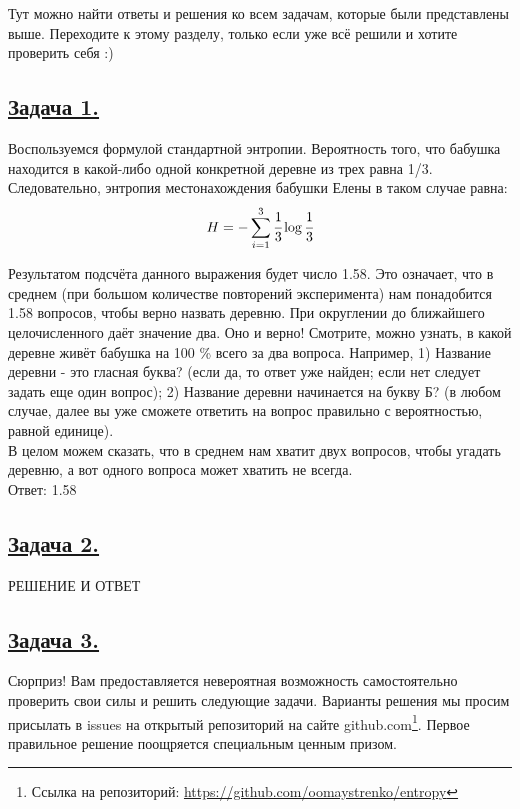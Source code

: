 Тут можно найти ответы и решения ко всем задачам, которые были представлены выше. Переходите к этому разделу, только если уже всё решили и хотите проверить себя :)

\subsection*{\hyperref[sec:problem1]{Задача 1.}}\label{sec:sol_problem1}

Воспользуемся формулой стандартной энтропии. Вероятность того, что бабушка находится в какой-либо одной конкретной деревне из трех равна 1/3. Следовательно, энтропия местонахождения бабушки Елены в таком случае равна: 
\[H=-\sum\limits_{i=1}^3 \cfrac{1}{3}\log \cfrac{1}{3} \]

Результатом подсчёта данного выражения будет число 1.58. Это означает, что в среднем (при большом количестве повторений эксперимента) нам понадобится 1.58 вопросов, чтобы верно назвать деревню. При округлении до ближайшего целочисленного даёт значение два. Оно и верно! Смотрите, можно узнать, в какой деревне живёт бабушка на 100 \%  всего за два вопроса. Например, 1) Название деревни - это гласная буква? (если да, то ответ уже найден; если нет следует задать еще один вопрос); 2) Название деревни начинается на букву Б? (в любом случае, далее вы уже сможете ответить на вопрос правильно с вероятностью, равной единице).  \\
В целом можем сказать, что в среднем нам хватит двух вопросов, чтобы угадать деревню, а вот одного вопроса может хватить не всегда. \\

Ответ: 1.58


\subsection*{\hyperref[sec:problem2]{Задача 2.}}\label{sec:sol_problem2}

РЕШЕНИЕ И ОТВЕТ

\subsection*{\hyperref[sec:problem3]{Задача 3.}}\label{sec:sol_problem3}

Сюрприз! Вам предоставляется невероятная возможность самостоятельно проверить свои силы и решить следующие задачи. Варианты решения мы просим присылать в issues на открытый репозиторий на сайте github.com\footnote{Ссылка на репозиторий: \url{https://github.com/oomaystrenko/entropy}}. Первое правильное решение поощряется специальным ценным призом. 

